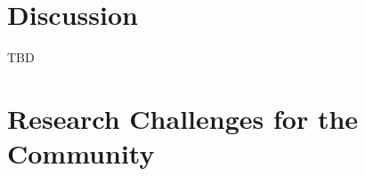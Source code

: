 \documentclass[runningheads]{llncs}
\begin{document}






\section{Discussion}

TBD

\section{Research Challenges for the Community}
\end{document}
